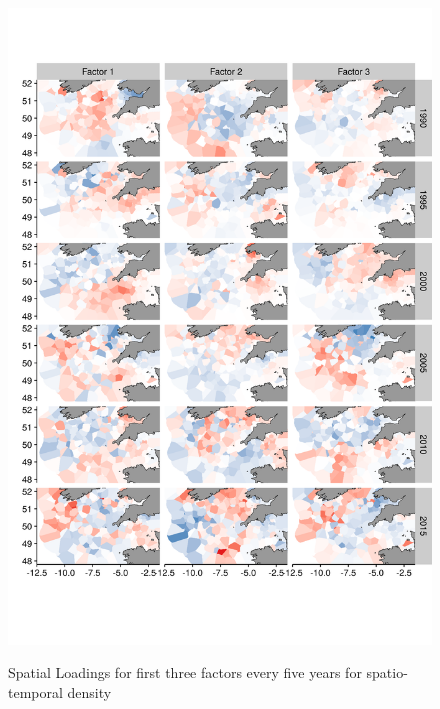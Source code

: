 \documentclass{article}
\begin{document}
\begin{figure}[!ht]
\begin{center}
	\includegraphics[width = 0.8\linewidth]{"figures/Suppl - SpatioTempLoadingsEpsilon2"}
	\label{fig:S7}
	\caption{Spatial Loadings for first three factors every five years for
	spatio-temporal density}
	\end{center}
\end{figure}
\end{document}
